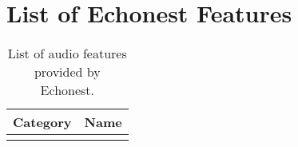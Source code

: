 \chapter{List of Echonest Features} 

\label{AppendixB} 


\begin{center}
\begin{longtable}{| p{} | p{} |} 
\hline
\textbf{Category} & \textbf{Name} \\ \hline

\caption[List of audio features provided by Echonest]{List of audio features provided by Echonest.}
\label{table:echonestFeatures}
\end{longtable}
\end{center}